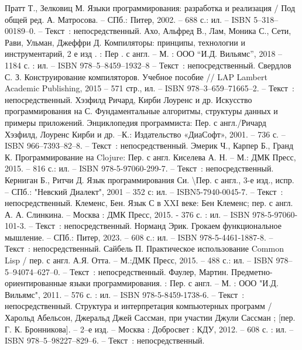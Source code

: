 
\begin{thebibliography}{9}
	
		Пратт Т., Зелковиц М. Языки программирования: разработка и реализация / Под общей ред. А. Матросова. -- СПб.: Питер, 2002. -- 688 с.: ил. -- ISBN 5–318–00189–0. -- Текст~: непосредственный.
		Ахо, Альфред В., Лам, Моника С., Сети, Рави, Ульман, Джеффри Д. Компиляторы: принципы, технологии и инструментарий, 2 е изд . : Пер . с англ. -- М. : ООО “И.Д. Вильямс”, 2018 -- 1184 с. : ил. – ISBN 978–5–8459–1932–8 – Текст~: непосредственный.
		Свердлов С. З. Конструирование компиляторов. Учебное пособие // LAP Lambert Academic Publishing, 2015 -- 571 стр., ил. – ISBN 978–3–659–71665–2. -- Текст~: непосредственный.
		Хэзфилд Ричард, Кирби Лоуренс и др. Искусство программирования на С. Фундаментальные алгоритмы, структуры данных и примеры приложений. Энциклопедия программиста: Пер. с англ./Ричард Хэзфилд, Лоуренс Кирби и др. –К.: Издательство «ДиаСофт», 2001. -- 736 с. -- ISBN 966–7393–82–8. -- Текст~: непосредственный.
		Эмерик Ч., Карпер Б., Гранд К. Программирование на Clojure: Пер. с англ. Киселева А. Н. -- М.: ДМК Пресс, 2015. -- 816 с.: ил. -- ISBN 978-5-97060-299-7. -- Текст~: непосредственный.
		Керниган Б., Ритчи Д. Язык программирования Си. \textbackslash Пер. с англ., 3-е  изд., испр. -- СПб.: "Невский Диалект", 2001 -- 352 с: ил. -- ISBN5-7940-0045-7. -- Текст~: непосредственный.
		Клеменс, Бен. Язык С в XXI веке: Бен Клеменс; пер. с англ. А. А. Слинкина. -- Москва : ДМК Пресс, 2015. - 376 с. : ил. -- ISBN 978-5-97060-101-3. -- Текст~: непосредственный.
		Норманд Эрик. Грокаем функциональное мышление. -- СПб.: Питер, 2023. -- 608 с.: ил. -- ISBN 978-5-4461-1887-8. -- Текст~: непосредственный.    
		Сайбель П. Практическое использование Common Lisp / пер. с англ. А.Я. Отта. -- М.:ДМК Пресс, 2015. – 488 с.: ил. -- ISBN 978–5–94074–627–0. -- Текст~: непосредственный.    
		Фаулер, Мартин. Предметно-ориентированные языки программирования. : Пер. с англ. -- М. : ООО "И.Д. Вильямс", 2011. -- 576 с. : ил. -- ISBN 978-5-8459-1738-6. -- Текст~: непосредственный.    
		Структура и интерпретация компьютерных программ / Харольд Абельсон, Джеральд Джей Сассман, при участии Джули Сассман ; [пер. Г. К. Бронникова]. -- 2–е изд. – Москва : Добросвет : КДУ, 2012. – 608 с. : ил. -- ISBN 978–5–98227–829–6. – Текст~: непосредственный.    

\end{thebibliography}
